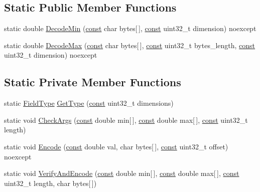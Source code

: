 \subsection*{Static Public Member Functions}
\begin{DoxyCompactItemize}
\item 
static double \mbox{\hyperlink{classlucene_1_1core_1_1document_1_1DoubleRange_a736e2ceb6f00b32f7867ec702da059b4}{Decode\+Min}} (\mbox{\hyperlink{ZlibCrc32_8h_a2c212835823e3c54a8ab6d95c652660e}{const}} char bytes\mbox{[}$\,$\mbox{]}, \mbox{\hyperlink{ZlibCrc32_8h_a2c212835823e3c54a8ab6d95c652660e}{const}} uint32\+\_\+t dimension) noexcept
\item 
static double \mbox{\hyperlink{classlucene_1_1core_1_1document_1_1DoubleRange_ad344a7b94c98b695feae8728ddc0de63}{Decode\+Max}} (\mbox{\hyperlink{ZlibCrc32_8h_a2c212835823e3c54a8ab6d95c652660e}{const}} char bytes\mbox{[}$\,$\mbox{]}, \mbox{\hyperlink{ZlibCrc32_8h_a2c212835823e3c54a8ab6d95c652660e}{const}} uint32\+\_\+t bytes\+\_\+length, \mbox{\hyperlink{ZlibCrc32_8h_a2c212835823e3c54a8ab6d95c652660e}{const}} uint32\+\_\+t dimension) noexcept
\end{DoxyCompactItemize}
\subsection*{Static Private Member Functions}
\begin{DoxyCompactItemize}
\item 
static \mbox{\hyperlink{classlucene_1_1core_1_1document_1_1FieldType}{Field\+Type}} \mbox{\hyperlink{classlucene_1_1core_1_1document_1_1DoubleRange_a358b2b706f12ead3d2ca826d2faf7cf4}{Get\+Type}} (\mbox{\hyperlink{ZlibCrc32_8h_a2c212835823e3c54a8ab6d95c652660e}{const}} uint32\+\_\+t dimensions)
\item 
static void \mbox{\hyperlink{classlucene_1_1core_1_1document_1_1DoubleRange_a10f3d27b685db535202452f5ba8693b9}{Check\+Args}} (\mbox{\hyperlink{ZlibCrc32_8h_a2c212835823e3c54a8ab6d95c652660e}{const}} double min\mbox{[}$\,$\mbox{]}, \mbox{\hyperlink{ZlibCrc32_8h_a2c212835823e3c54a8ab6d95c652660e}{const}} double max\mbox{[}$\,$\mbox{]}, \mbox{\hyperlink{ZlibCrc32_8h_a2c212835823e3c54a8ab6d95c652660e}{const}} uint32\+\_\+t length)
\item 
static void \mbox{\hyperlink{classlucene_1_1core_1_1document_1_1DoubleRange_a2763582d3f37e3a080fc1e2afe48277c}{Encode}} (\mbox{\hyperlink{ZlibCrc32_8h_a2c212835823e3c54a8ab6d95c652660e}{const}} double val, char bytes\mbox{[}$\,$\mbox{]}, \mbox{\hyperlink{ZlibCrc32_8h_a2c212835823e3c54a8ab6d95c652660e}{const}} uint32\+\_\+t offset) noexcept
\item 
static void \mbox{\hyperlink{classlucene_1_1core_1_1document_1_1DoubleRange_a2171d66292b3437034c90c68baaa08db}{Verify\+And\+Encode}} (\mbox{\hyperlink{ZlibCrc32_8h_a2c212835823e3c54a8ab6d95c652660e}{const}} double min\mbox{[}$\,$\mbox{]}, \mbox{\hyperlink{ZlibCrc32_8h_a2c212835823e3c54a8ab6d95c652660e}{const}} double max\mbox{[}$\,$\mbox{]}, \mbox{\hyperlink{ZlibCrc32_8h_a2c212835823e3c54a8ab6d95c652660e}{const}} uint32\+\_\+t length, char bytes\mbox{[}$\,$\mbox{]})
\end{DoxyCompactItemize}
